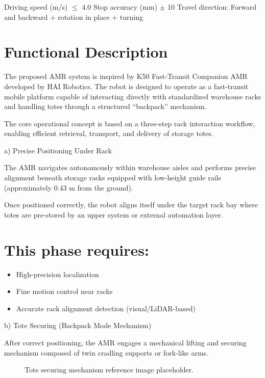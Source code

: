 Driving speed (m/s) $\leq$ 4.0 Stop accuracy (mm) $\pm$ 10 Travel direction: Forward and backward + rotation in place + turning

\section*{Functional Description}

The proposed AMR system is inspired by K50 Fast-Transit Companion AMR developed by HAI Robotics. The robot is designed to operate as a fast-transit mobile platform capable of interacting directly with standardized warehouse racks and handling totes through a structured ``backpack'' mechanism.

The core operational concept is based on a three-step rack interaction workflow, enabling efficient retrieval, transport, and delivery of storage totes.

a) Precise Positioning Under Rack

The AMR navigates autonomously within warehouse aisles and performs precise alignment beneath storage racks equipped with low-height guide rails (approximately 0.43 m from the ground).

Once positioned correctly, the robot aligns itself under the target rack bay where totes are pre-stored by an upper system or external automation layer.

\section*{This phase requires:}

\begin{itemize}
    \item High-precision localization
    \item Fine motion control near racks
    \item Accurate rack alignment detection (visual/LiDAR-based)
\end{itemize}

b) Tote Securing (Backpack Mode Mechanism)

After correct positioning, the AMR engages a mechanical lifting and securing mechanism composed of twin cradling supports or fork-like arms.

\begin{figure}[H]
\centering
{}
\caption{Tote securing mechanism reference image placeholder.}
\end{figure}

